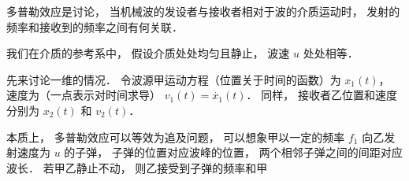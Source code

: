
多普勒效应是讨论， 当机械波的发设者与接收者相对于波的介质运动时， 发射的频率和接收到的频率之间有何关联．

我们在介质的参考系中， 假设介质处处均匀且静止， 波速 $u$ 处处相等．

先来讨论一维的情况． 令波源甲运动方程（位置关于时间的函数）为 $x_1(t)$， 速度为（一点表示对时间求导） $v_1(t) = \dot{x_1}(t)$． 同样， 接收者乙位置和速度分别为 $x_2(t)$ 和 $v_2(t)$．

本质上， 多普勒效应可以等效为追及问题， 可以想象甲以一定的频率 $f_1$ 向乙发射速度为 $u$ 的子弹， 子弹的位置对应波峰的位置， 两个相邻子弹之间的间距对应波长． 若甲乙静止不动， 则乙接受到子弹的频率和甲
